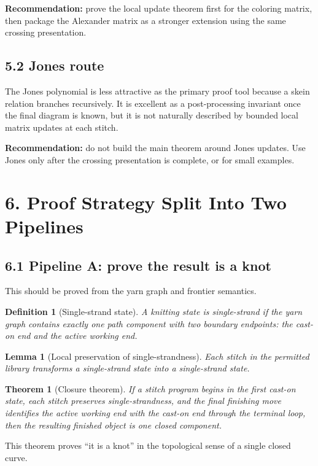 \documentclass[11pt]{article}
\newtheorem{definition}{Definition}
\newtheorem{theorem}{Theorem}
\newtheorem{lemma}{Lemma}
\begin{document}
\textbf{Recommendation:} prove the local update theorem first for the coloring matrix, then package the Alexander matrix as a stronger extension using the same crossing presentation.

\subsection*{5.2 Jones route}
The Jones polynomial is less attractive as the primary proof tool because a skein relation branches recursively. It is excellent as a post-processing invariant once the final diagram is known, but it is not naturally described by bounded local matrix updates at each stitch.

\textbf{Recommendation:} do not build the main theorem around Jones updates. Use Jones only after the crossing presentation is complete, or for small examples.

\section*{6. Proof Strategy Split Into Two Pipelines}

\subsection*{6.1 Pipeline A: prove the result is a knot}
This should be proved from the yarn graph and frontier semantics.

\begin{definition}[Single-strand state]
A knitting state is single-strand if the yarn graph contains exactly one path component with two boundary endpoints: the cast-on end and the active working end.
\end{definition}

\begin{lemma}[Local preservation of single-strandness]
Each stitch in the permitted library transforms a single-strand state into a single-strand state.
\end{lemma}

\begin{theorem}[Closure theorem]
If a stitch program begins in the first cast-on state, each stitch preserves single-strandness, and the final finishing move identifies the active working end with the cast-on end through the terminal loop, then the resulting finished object is one closed component.
\end{theorem}

This theorem proves ``it is a knot'' in the topological sense of a single closed curve.
\end{document}
